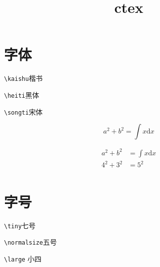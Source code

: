 \documentclass[UTF8]{article}
\title{ctex}
\date{}
\begin{document}
\maketitle

\section{字体}
\kaishu \verb!\kaishu!楷书

\heiti \verb!\heiti!黑体

\songti \verb!\songti!宋体

   \begin{equation}
     \label{eq:adf}
     a^{2} + b^{2} = \int x \mathrm{d}x
   \end{equation}

   \begin{align}
     \label{eq:adf}
     a^{2} + b^{2} & = \int x \mathrm{d}x \\
     4^{2} + 3^{2} & = 5^{2}\\
   \end{align}
   
\section{字号}
\tiny \verb!\tiny!七号

\normalsize \verb!\normalsize!五号

\large \verb!\large! 小四
\end{document}

